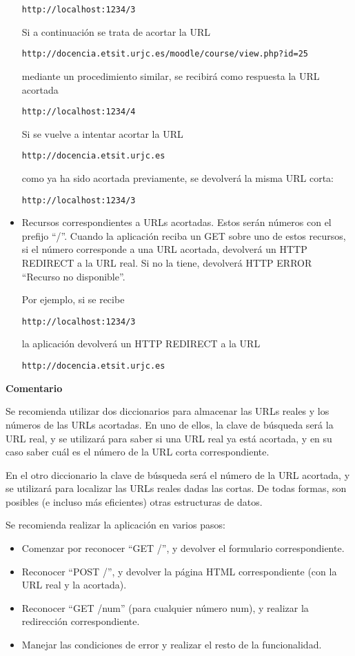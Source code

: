 \begin{itemize}
\verb|http://localhost:1234/3|

Si a continuación se trata de acortar la URL

\verb|http://docencia.etsit.urjc.es/moodle/course/view.php?id=25|

mediante un procedimiento similar, se recibirá como respuesta la URL acortada

\verb|http://localhost:1234/4|

Si se vuelve a intentar acortar la URL

\verb|http://docencia.etsit.urjc.es|

como ya ha sido acortada previamente, se devolverá la misma URL corta:

\verb|http://localhost:1234/3|

\item Recursos correspondientes a URLs acortadas. Estos serán números con el prefijo ``/''. Cuando la aplicación reciba un GET sobre uno de estos recursos, si el número corresponde a una URL acortada, devolverá un HTTP REDIRECT a la URL real. Si no la tiene, devolverá HTTP ERROR ``Recurso no disponible''.

Por ejemplo, si se recibe 

\verb|http://localhost:1234/3|

la aplicación devolverá un HTTP REDIRECT a la URL

\verb|http://docencia.etsit.urjc.es|

\end{itemize}

\textbf{Comentario}

Se recomienda utilizar dos diccionarios para almacenar las URLs reales y los números de las URLs acortadas. En uno de ellos, la clave de búsqueda será la URL real, y se utilizará para saber si una URL real ya está acortada, y en su caso saber cuál es el número de la URL corta correspondiente.

En el otro diccionario la clave de búsqueda será el número de la URL acortada, y se utilizará para localizar las URLs reales dadas las cortas. De todas formas, son posibles (e incluso más eficientes) otras estructuras de datos.

Se recomienda realizar la aplicación en varios pasos:

\begin{itemize}
\item Comenzar por reconocer ``GET /'', y devolver el formulario correspondiente.
\item Reconocer ``POST /'', y devolver la página HTML correspondiente (con la URL real y la acortada).
\item Reconocer ``GET /num'' (para cualquier número num), y realizar la redirección correspondiente.
\item Manejar las condiciones de error y realizar el resto de la funcionalidad.
\end{itemize}

